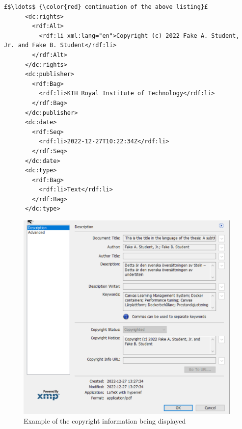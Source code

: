 \begin{lstlisting}[style=myXML,
caption={The \texttt{dc:rights}, \texttt{dc:publisher}, \texttt{dc:date}, and \texttt{dc:type} metadata embedded in a PDF file (some reformatting has been done to fit the text in the boarders)}, label={lst:pdfinfoOutputPart8}]
£$\ldots$ {\color{red} continuation of the above listing}£ 
      <dc:rights>
        <rdf:Alt>
          <rdf:li xml:lang="en">Copyright (c) 2022 Fake A. Student, Jr. and Fake B. Student</rdf:li>
        </rdf:Alt>
      </dc:rights>
      <dc:publisher>
        <rdf:Bag>
          <rdf:li>KTH Royal Institute of Technology</rdf:li>
        </rdf:Bag>
      </dc:publisher>
      <dc:date>
        <rdf:Seq>
          <rdf:li>2022-12-27T10:22:34Z</rdf:li>
        </rdf:Seq>
      </dc:date>
      <dc:type>
        <rdf:Bag>
          <rdf:li>Text</rdf:li>
        </rdf:Bag>
      </dc:type>
\end{lstlisting}

 	
\begin{figure}[!ht]
  \begin{center}
    \includegraphics[width=0.99\textwidth]{README_notes/README-examiner-figures/Example-of-copyright-data-Screenshot_20221227_143035.png}
  \end{center}
  \caption{Example of the copyright information being displayed}
  \label{fig:exampleCopyrightXMPdisplayed}
\end{figure}

